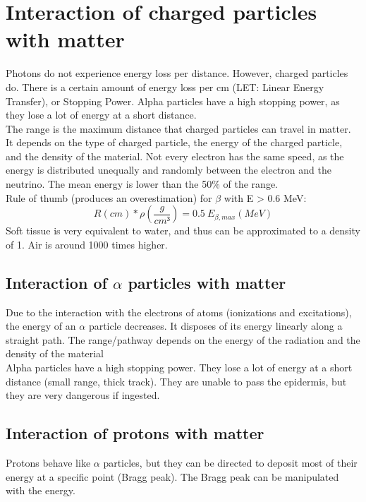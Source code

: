 \section{Interaction of charged particles with matter}
Photons do not experience energy loss per distance. However, charged particles do. There is a certain amount of energy loss per cm (LET: Linear Energy Transfer), or Stopping Power. Alpha particles have a high stopping power, as they lose a lot of energy at a short distance.\\
The range is the maximum distance that charged particles can travel in matter. It depends on the type of charged particle, the energy of the charged particle, and the density of the material. Not every electron has the same speed, as the energy is distributed unequally and randomly between the electron and the neutrino. The mean energy is lower than the 50\% of the range. \\
Rule of thumb (produces an overestimation) for $\beta$ with E > 0.6 MeV:
\[ R (cm) * \rho (\frac{g}{cm³} )= 0.5\ E_{\beta,max} (MeV) \]
Soft tissue is very equivalent to water, and thus can be approximated to a density of 1. Air is around 1000 times higher.

\subsection{Interaction of $\alpha$ particles with matter}
Due to the interaction with the electrons of atoms (ionizations and excitations), the energy of an $\alpha$ particle decreases. It disposes of its energy linearly along a straight path. The range/pathway depends on the energy of the radiation and the density of the material\\
Alpha particles have a high stopping power. They lose a lot of energy at a short distance (small range, thick track). They are unable to pass the epidermis, but they are very dangerous if ingested. \\

\subsection{Interaction of protons with matter}
Protons behave like $\alpha$ particles, but they can be directed to deposit most of their energy at a specific point (Bragg peak). The Bragg peak can be manipulated with the energy.


